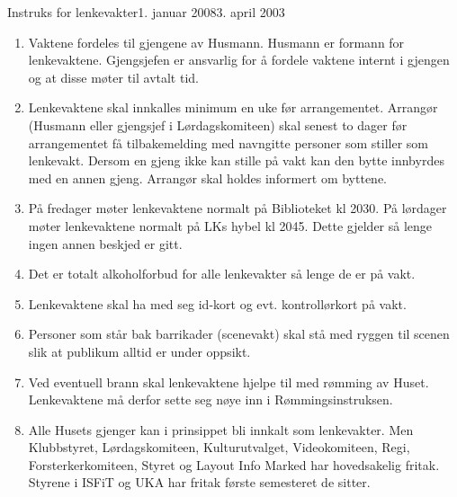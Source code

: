 \begin{instruks}{Instruks for lenkevakter}{1. januar 2008}{3. april 2003}

    \begin{enumerate}
        \item Vaktene fordeles til gjengene av Husmann. Husmann er formann for
            lenkevaktene. Gjengsjefen er ansvarlig
            for å fordele vaktene internt i gjengen og at disse møter til avtalt tid.
        \item Lenkevaktene skal innkalles minimum en uke før arrangementet. Arrangør
            (Husmann eller gjengsjef i
            Lørdagskomiteen) skal senest to dager før arrangementet få tilbakemelding med
            navngitte personer som
            stiller som lenkevakt. Dersom en gjeng ikke kan stille på vakt kan den bytte
            innbyrdes med en annen gjeng.
            Arrangør skal holdes informert om byttene.
        \item På fredager møter lenkevaktene normalt på Biblioteket kl 2030. På lørdager
            møter lenkevaktene normalt på
            LKs hybel kl 2045. Dette gjelder så lenge ingen annen beskjed er gitt.
        \item Det er totalt alkoholforbud for alle lenkevakter så lenge de er på vakt.
        \item Lenkevaktene skal ha med seg id-kort og evt. kontrollørkort på vakt.
        \item Personer som står bak barrikader (scenevakt) skal stå med ryggen til scenen
            slik at publikum alltid er under oppsikt.
        \item Ved eventuell brann skal lenkevaktene hjelpe til med rømming av Huset.
            Lenkevaktene må derfor sette seg nøye inn i Rømmingsinstruksen.
        \item Alle Husets gjenger kan i prinsippet bli innkalt som lenkevakter. Men
            Klubbstyret, Lørdagskomiteen, Kulturutvalget, Videokomiteen, Regi, Forsterkerkomiteen, Styret og Layout Info
            Marked har hovedsakelig fritak. Styrene i ISFiT og UKA har fritak første semesteret de sitter.
    \end{enumerate}
\end{instruks}






